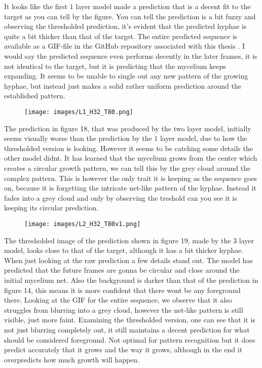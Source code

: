 \documentclass[a4paper,12pt]{article}
\begin{document}
It looks like the first $1$ layer model made a prediction that is a decent fit to the target as you can tell by the figure. You can tell the prediction is a bit fuzzy and observing the thresholded prediction, it's evident that the predicted hyphae is quite a bit thicker than that of the target. The entire predicted sequence is available as a GIF-file in the GitHub repository associated with this thesis \cite{gagarahn2025bachelor}.
I would say the predicted sequence even performs decently in the later frames, it is not identical to the target, but it is predicting that the mycelium keeps expanding. It seems to be unable to single out any new pattern of the growing hyphae, but instead just makes a solid rather uniform prediction around the established pattern.
\begin{figure}[H]
  \centering
  \texttt{[image: images/L1\_H32\_T80.png]}
  \caption{} %
  \label{fig:n17}
\end{figure}
The prediction in figure 18, that was produced by the two layer model, initially seems visually worse than the prediction by the $1$ layer model, due to how the thresholded version is looking. However it seems to be catching some details the other model didnt. It has learned that the mycelium grows from the center which creates a circular growth pattern, we can tell this by the grey cloud around the complex pattern. This is however the only trait it is keeping as the sequence goes on, because it is forgetting the intricate net-like pattern of the hyphae. Instead it fades into a grey cloud and only by observing the treshold can you see it is keeping its circular prediction.
\begin{figure}[H]
  \centering
  \texttt{[image: images/L2\_H32\_T80v1.png]}
  \caption{} %
  \label{fig:n18}
\end{figure}
The thresholded image of the prediction shown in figure 19, made by the $3$ layer model, looks close to that of the target, although it has a bit thicker hyphae. When just looking at the raw prediction a few details stand out. The model has predicted that the future frames are gonna be circular and close around the initial mycelium net. Also the background is darker than that of the prediction in figure 14, this means it is more confident that there wont be any foreground there. Looking at the GIF for the entire sequence, we observe that it also struggles from blurring into a grey cloud, however the net-like pattern is still visible, just more faint. Examining the thresholded version, one can see that it is not just blurring completely out, it still maintains a decent prediction for what should be considered foreground. Not optimal for pattern recognition but it does predict accurately that it grows and the way it grows, although in the end it overpredicts how much growth will happen.
\end{document}
